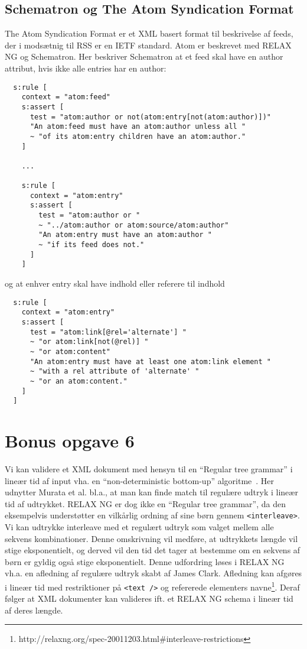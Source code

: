\documentclass[a4paper,10pt]{article}
\begin{document}
\subsection*{Schematron og The Atom Syndication Format}
The Atom Syndication Format er et XML basert format til beskrivelse af feeds, der i modsætnig til RSS er en IETF standard.  Atom er beskrevet med RELAX NG og Schematron. Her beskriver Schematron at et feed skal have en author attribut, hvis ikke alle entries har en author: 
\begin{lstlisting}
  s:rule [
    context = "atom:feed"
    s:assert [
      test = "atom:author or not(atom:entry[not(atom:author)])"
      "An atom:feed must have an atom:author unless all "
      ~ "of its atom:entry children have an atom:author."
    ]

    ...
    
    s:rule [
      context = "atom:entry"
      s:assert [
        test = "atom:author or "
        ~ "../atom:author or atom:source/atom:author"
        "An atom:entry must have an atom:author "
        ~ "if its feed does not."
      ]
    ]
\end{lstlisting}
og at enhver entry skal have indhold eller referere til indhold
\begin{lstlisting}
  s:rule [
    context = "atom:entry"
    s:assert [
      test = "atom:link[@rel='alternate'] "
      ~ "or atom:link[not(@rel)] "
      ~ "or atom:content"
      "An atom:entry must have at least one atom:link element "
      ~ "with a rel attribute of 'alternate' "
      ~ "or an atom:content."
    ]
  ]
\end{lstlisting}

\section*{Bonus opgave 6}
Vi kan validere et XML dokument med hensyn til en ``Regular tree grammar'' i lineær tid af input vha. en ``non-deterministic bottom-up'' algoritme~\cite[s. 12]{Murata00taxonomyof}. Her udnytter Murata et al. bl.a., at man kan finde match til regulære udtryk i lineær tid af udtrykket. RELAX NG er dog ikke en ``Regular tree grammar'', da den eksempelvis understøtter en vilkårlig ordning af sine børn gennem \texttt{<interleave>}. Vi kan udtrykke interleave med et regulært udtryk som valget mellem alle sekvens kombinationer. Denne omskrivning vil medføre, at udtrykkets længde vil stige eksponentielt, og derved vil den tid det tager at bestemme om en sekvens af børn er gyldig også stige eksponentielt. Denne udfordring løses i RELAX NG vh.a. en afledning af regulære udtryk skabt af James Clark. Afledning kan afgøres i lineær tid med restriktioner på \texttt{<text />} og refererede elementers navne\footnote{http://relaxng.org/spec-20011203.html\#interleave-restrictions}. Deraf følger at XML dokumenter kan valideres ift. et RELAX NG schema i lineær tid af deres længde. 
{}
 

 
\end{document}
